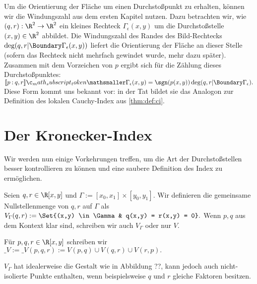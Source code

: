 \documentclass{mythesis}
\begin{document}
Um die Orientierung der Fläche um einen Durchstoßpunkt zu erhalten, können wir die Windungszahl aus dem ersten Kapitel nutzen.
Dazu betrachten wir, wie $(q, r): \R^2 \to \R^2$ ein kleines Rechteck $\Gamma_\epsilon(x,y)$ um die Durchstoßstelle $(x,y) \in \R^2$ abbildet.
Die Windungszahl des Randes des Bild-Rechtecks $\deg(q,r|\Boundary\Gamma_\epsilon(x,y))$ liefert die Orientierung der Fläche an dieser Stelle (sofern das Rechteck nicht mehrfach gewindet wurde, mehr dazu später).
Zusammen mit dem Vorzeichen von $p$ ergibt sich für die Zählung dieses Durchstoßpunktes:
\begin{math}
    \Index{\Gamma_\epsilon(x,y)}{p}{q,r}
    = \sgn(p(x,y)) \deg(q,r|\Boundary\Gamma_\epsilon).
\end{math}
Diese Form kommt uns bekannt vor: in der Tat bildet sie das Analogon zur Definition des lokalen Cauchy-Index aus \ref{thm:def:ci}.

\section{Der Kronecker-Index}


Wir werden nun einige Vorkehrungen treffen, um die Art der Durchstoßstellen besser kontrollieren zu können und eine saubere Definition des Index zu ermöglichen.



\begin{definition}
    Seien $q, r \in \R[x,y]$ und $\Gamma := [x_0, x_1] \times [y_0, y_1]$.
    Wir definieren die gemeinsame Nullstellenmenge von $q, r$ auf $\Gamma$ als
    \begin{math}
        V_\Gamma(q,r) :=
        \Set{(x,y) \in \Gamma & q(x,y) = r(x,y) = 0}.
    \end{math}
    Wenn $p, q$ aus dem Kontext klar sind, schreiben wir auch $V_\Gamma$ oder nur $V$.

    Für $p, q, r \in \R[x,y]$ schreiben wir
    \begin{math}
        \_V := \_V(p,q,r) := V(p,q) \cup V(q,r) \cup V(r,p).
    \end{math}
\end{definition}

$V_\Gamma$ hat idealerweise die Gestalt wie in Abbildung ??, kann jedoch auch nicht-isolierte Punkte enthalten, wenn beispielsweise $q$ und $r$ gleiche Faktoren besitzen.
\end{document}
